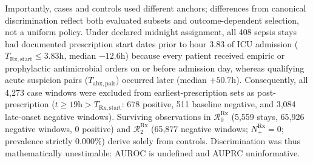 \documentclass[12pt,a4paper]{article}
\begin{document}
Importantly, cases and controls used different anchors; differences from canonical discrimination reflect both evaluated subsets and outcome-dependent selection, not a uniform policy. Under declared midnight assignment, all 408 sepsis stays had documented prescription start dates prior to hour 3.83 of ICU admission ($T_{\mathrm{Rx,start}} \le 3.83\text{h}$, median $-12.6\text{h}$) because every patient received empiric or prophylactic antimicrobial orders on or before admission day, whereas qualifying acute suspicion pairs ($T_{\mathrm{abx,pair}}$) occurred later (median $+50.7\text{h}$). Consequently, all 4,273 case windows were excluded from earliest-prescription sets as post-prescription ($t \ge 19\text{h} > T_{\mathrm{Rx,start}}$: 678 positive, 511 baseline negative, and 3,084 late-onset negative windows). Surviving observations in $\mathcal{R}_0^{\mathrm{Rx}}$ (5,559 stays, 65,926 negative windows, 0 positive) and $\mathcal{R}_2^{\mathrm{Rx}}$ (65,877 negative windows; $N_+^{\mathrm{Rx}} = 0$; prevalence strictly 0.000\%) derive solely from controls. Discrimination was thus mathematically unestimable: AUROC is undefined and AUPRC uninformative.
\end{document}
